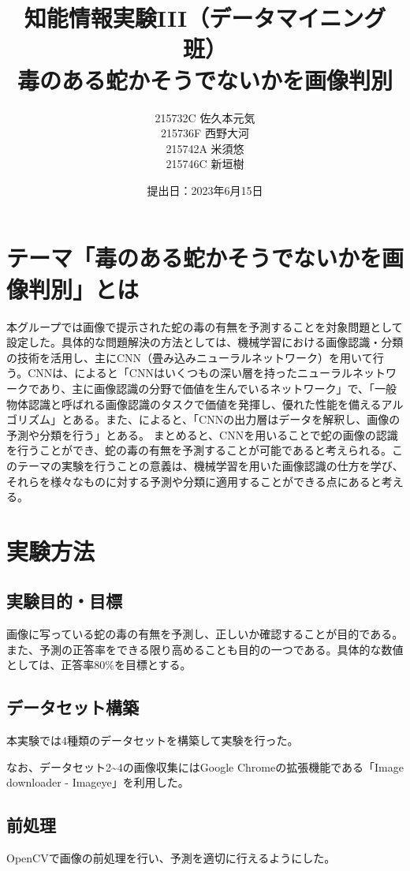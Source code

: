 \documentclass[a4paper, 11pt, titlepage]{jsarticle}
\title{知能情報実験III（データマイニング班）\\毒のある蛇かそうでないかを画像判別}
\author{215732C 佐久本元気\\215736F 西野大河\\215742A 米須悠\\215746C 新垣樹\\}
\date{提出日：2023年6月15日}
\begin{document}
\maketitle
\tableofcontents
\clearpage

\section{テーマ「毒のある蛇かそうでないかを画像判別」とは}
本グループでは画像で提示された蛇の毒の有無を予測することを対象問題として設定した。具体的な問題解決の方法としては、機械学習における画像認識・分類の技術を活用し、主にCNN（畳み込みニューラルネットワーク）を用いて行う。CNNは、\cite{theme1}によると「CNNはいくつもの深い層を持ったニューラルネットワークであり、主に画像認識の分野で価値を生んでいるネットワーク」で、「一般物体認識と呼ばれる画像認識のタスクで価値を発揮し、優れた性能を備えるアルゴリズム」とある。また、\cite{theme2}によると、「CNNの出力層はデータを解釈し、画像の予測や分類を行う」とある。
まとめると、CNNを用いることで蛇の画像の認識を行うことができ、蛇の毒の有無を予測することが可能であると考えられる。このテーマの実験を行うことの意義は、機械学習を用いた画像認識の仕方を学び、それらを様々なものに対する予測や分類に適用することができる点にあると考える。

\section{実験方法}
\subsection{実験目的・目標}
画像に写っている蛇の毒の有無を予測し、正しいか確認することが目的である。また、予測の正答率をできる限り高めることも目的の一つである。具体的な数値としては、正答率80\%を目標とする。

\subsection{データセット構築}
本実験では4種類のデータセットを構築して実験を行った。\par
なお、データセット2\textasciitilde4の画像収集にはGoogle Chromeの拡張機能である「Image downloader - Imageye」を利用した。\par

\subsection{前処理}
OpenCVで画像の前処理を行い、予測を適切に行えるようにした。 \par
\end{document}
